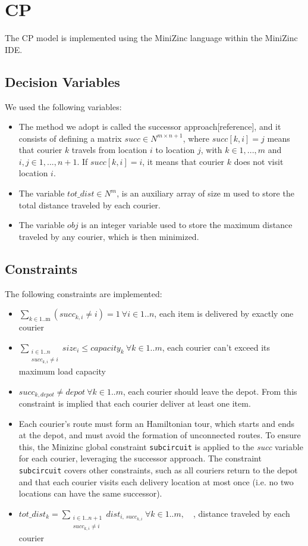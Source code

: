 \documentclass{article}
\begin{document}
\section{CP}
The CP model is implemented using the MiniZinc language within the MiniZinc IDE. 
\subsection{Decision Variables}
We used the following variables:

\begin{itemize}
\item
The method we adopt is called the successor approach[reference], and it consists of defining a matrix $succ \in {N^{m \times n+1}}$, where $succ[k, i] = j$ means that courier $k$ travels from location $i$ to location $j$, with $k \in {1, ..., m}$ and $i, j \in {1, ..., n+1}$. If $succ[k, i] = i$, it means that courier $k$ does not visit location $i$.
\item 
The variable $tot\_dist \in {N^{m}}$, is an auxiliary array of size m used to store the total distance traveled by each courier.
\item 
The variable $obj$ is an integer variable used to store the maximum distance traveled by any courier, which is then minimized.
\end{itemize}

\subsection{Constraints}
The following constraints are implemented:
\begin{itemize}
\item
$\sum_{k \in \text{1..m}} \left(succ_{k,i} \ne i \right) = 1 \: \forall i \in 1..n$, each item is delivered by exactly one courier
\item 
$\sum_{\substack{i \in 1..n \\ succ_{k,i} \ne i }} size_{i} \leq capacity_{k} \: \forall k \in 1..m$, each courier can't exceed its maximum load capacity
\item
$succ_{k,depot} \ne depot\:\forall k \in 1..m$, each courier should leave the depot. From this constraint is implied that each courier deliver at least one item.

\item
Each courier’s route must form an Hamiltonian tour, which starts and ends at the depot, and must avoid the formation of unconnected routes. To ensure this, the Minizinc global constraint \texttt{subcircuit} is applied to the \textit{succ} variable for each courier, leveraging the successor approach. 
The constraint \texttt{subcircuit} covers other constraints, such as all couriers return to the depot and that each courier visits each delivery location at most once (i.e. no two locations can have the same successor).

\item 
$tot\_dist_k = \sum_{\substack{i \in 1..n+1 \\ succ_{k,i} \ne i}} dist_{i, \, succ_{k,i}}\:\forall k \in 1..m, \quad$, distance traveled by each courier
\end{itemize}
\end{document}
